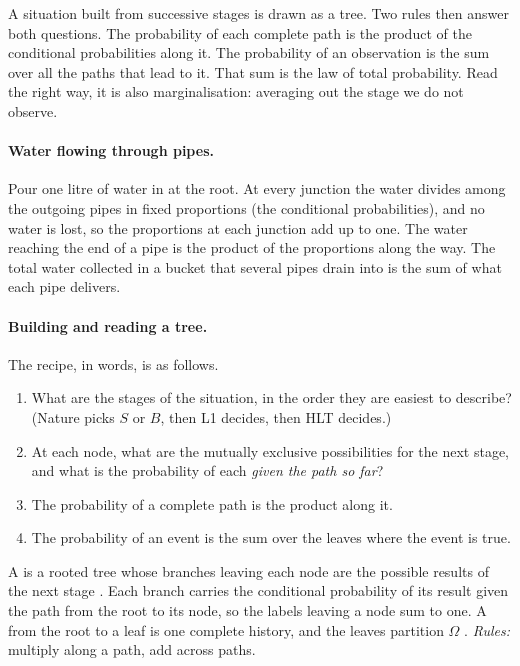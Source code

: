 A situation built from successive stages is drawn as a tree. Two rules then
answer both questions. The probability of each complete path is the product of
the conditional probabilities along it. The probability of an observation is
the sum over all the paths that lead to it. That sum is the law of total
probability. Read the right way, it is also marginalisation: averaging out the
stage we do not observe.

\paragraph{Water flowing through pipes.}
Pour one litre of water in at the root. At every junction the water divides
among the outgoing pipes in fixed proportions (the conditional probabilities),
and no water is lost, so the proportions at each junction add up to one. The
water reaching the end of a pipe is the product of the proportions along the
way. The total water collected in a bucket that several pipes drain into is
the sum of what each pipe delivers.

\paragraph{Building and reading a tree.}
The recipe, in words, is as follows.
\begin{enumerate}[leftmargin=1.5em,itemsep=1pt]
  \item What are the stages of the situation, in the order they are easiest
        to describe? (Nature picks $S$ or $B$, then L1 decides, then HLT decides.)
  \item At each node, what are the mutually exclusive possibilities for the
        next stage, and what is the probability of each \emph{given the path so far}?
  \item The probability of a complete path is the product along it.
  \item The probability of an event is the sum over the leaves where the event
        is true.
\end{enumerate}

\begin{workdef}
A  is a rooted tree whose branches leaving each
node are the possible results of the next stage . Each branch carries the
conditional probability of its result given the path from the root to its
node, so the labels leaving a node sum to one. A  from the root
to a leaf is one complete history, and the leaves partition $\Omega$
.
\emph{Rules:} multiply along a path, add across paths.
\end{workdef}

